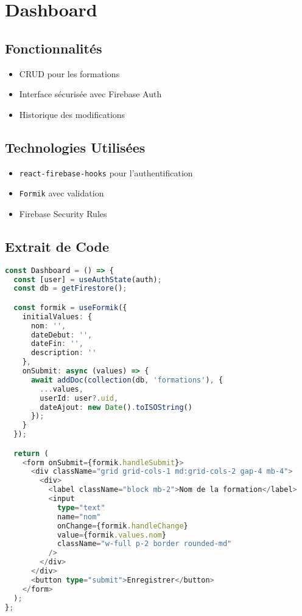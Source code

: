 \documentclass[12pt,a4paper]{report}
\begin{document}
\section{Dashboard}
\subsection{Fonctionnalités}
\begin{itemize}
\item CRUD pour les formations
\item Interface sécurisée avec Firebase Auth
\item Historique des modifications
\end{itemize}

\subsection{Technologies Utilisées}
\begin{itemize}
\item \texttt{react-firebase-hooks} pour l'authentification
\item \texttt{Formik} avec validation
\item Firebase Security Rules
\end{itemize}

\subsection{Extrait de Code}
\begin{lstlisting}[language=TypeScript,caption=CRUD Formations]
const Dashboard = () => {
  const [user] = useAuthState(auth);
  const db = getFirestore();

  const formik = useFormik({
    initialValues: {
      nom: '',
      dateDebut: '',
      dateFin: '',
      description: ''
    },
    onSubmit: async (values) => {
      await addDoc(collection(db, 'formations'), {
        ...values,
        userId: user?.uid,
        dateAjout: new Date().toISOString()
      });
    }
  });

  return (
    <form onSubmit={formik.handleSubmit}>
      <div className="grid grid-cols-1 md:grid-cols-2 gap-4 mb-4">
        <div>
          <label className="block mb-2">Nom de la formation</label>
          <input
            type="text"
            name="nom"
            onChange={formik.handleChange}
            value={formik.values.nom}
            className="w-full p-2 border rounded-md"
          />
        </div>
      </div>
      <button type="submit">Enregistrer</button>
    </form>
  );
};
\end{lstlisting}
\end{document}
